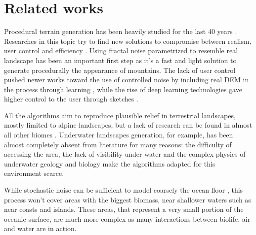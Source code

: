 


\section{Related works}
\label{sec:semantic-representation_related-works}
Procedural terrain generation has been heavily studied for the last 40 years \cite{Galin2019}. Researches in this topic try to find new solutions to compromise between realism, user control and efficiency \cite{Gain2009}. Using fractal noise parametrized to resemble real landscape has been an important first step \cite{Musgrave1989} as it's a fast and light solution to generate procedurally the appearance of mountains. The lack of user control pushed newer works toward the use of controlled noise by including real DEM in the process through learning \cite{Kapp2020, Brosz2007}, while the rise of deep learning technologies gave higher control to the user through sketches \cite{Guerin2017, Talgorn2018}.

All the algorithms aim to reproduce plausible relief in terrestrial landscapes, mostly limited to alpine landscapes, but a lack of research can be found in almost all other biomes \cite{Smelik2014}. Underwater landscapes generation, for example, has been almost completely absent from literature for many reasons: the difficulty of accessing the area, the lack of visibility under water and the complex physics of underwater geology and biology make the algorithms adapted for this environment scarce. 

While stochastic noise can be sufficient to model coarsely the ocean floor \cite{Mareschal1989}, this process won't cover areas with the biggest biomass, near shallower waters such as near coasts and islands. These areas, that represent a very small portion of the oceanic surface, are much more complex as many interactions between biolife, air and water are in action.

